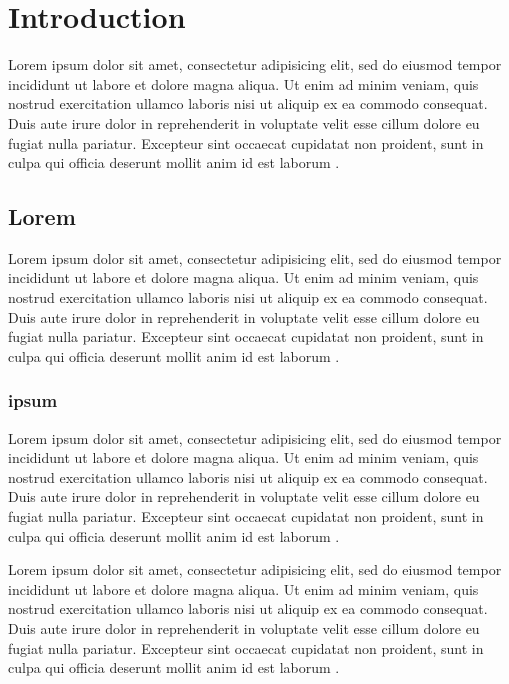 
\chapter{Introduction}

Lorem ipsum dolor sit amet, consectetur adipisicing elit, sed do eiusmod tempor incididunt ut
labore et dolore magna aliqua. Ut enim ad minim veniam, quis nostrud exercitation ullamco
laboris nisi ut aliquip ex ea commodo consequat. Duis aute irure dolor in reprehenderit in
voluptate velit esse cillum dolore eu fugiat nulla pariatur. Excepteur sint occaecat cupidatat
non proident, sunt in culpa qui officia deserunt mollit anim id est laborum \cite{freeman2004}.

\section{Lorem}

Lorem ipsum dolor sit amet, consectetur adipisicing elit, sed do eiusmod tempor incididunt ut
labore et dolore magna aliqua. Ut enim ad minim veniam, quis nostrud exercitation ullamco
laboris nisi ut aliquip ex ea commodo consequat. Duis aute irure dolor in reprehenderit in
voluptate velit esse cillum dolore eu fugiat nulla pariatur. Excepteur sint occaecat cupidatat
non proident, sunt in culpa qui officia deserunt mollit anim id est laborum \cite{freeman2004}.

\subsection{ipsum}

Lorem ipsum dolor sit amet, consectetur adipisicing elit, sed do eiusmod tempor incididunt ut
labore et dolore magna aliqua. Ut enim ad minim veniam, quis nostrud exercitation ullamco
laboris nisi ut aliquip ex ea commodo consequat. Duis aute irure dolor in reprehenderit in
voluptate velit esse cillum dolore eu fugiat nulla pariatur. Excepteur sint occaecat cupidatat
non proident, sunt in culpa qui officia deserunt mollit anim id est laborum \cite{freeman2004}.

Lorem ipsum dolor sit amet, consectetur adipisicing elit, sed do eiusmod tempor incididunt ut
labore et dolore magna aliqua. Ut enim ad minim veniam, quis nostrud exercitation ullamco
laboris nisi ut aliquip ex ea commodo consequat. Duis aute irure dolor in reprehenderit in
voluptate velit esse cillum dolore eu fugiat nulla pariatur. Excepteur sint occaecat cupidatat
non proident, sunt in culpa qui officia deserunt mollit anim id est laborum \cite{freeman2004}.

